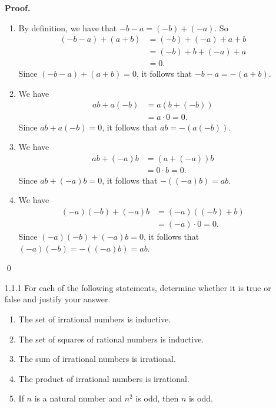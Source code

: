 \begin{enumerate}
      \textbf{Proof.} 
      \begin{enumerate}
         \item By definition, we have that $-b - a = (-b) + (-a)$. So
               \begin{align*}
                  (-b - a) + (a + b) &= (-b) + (-a) + a + b \\
                                 &= (-b) + b + (-a) + a \\
                                 &= 0.
               \end{align*}
               Since $(-b - a) + (a + b) = 0$, it follows that
               $-b - a = -(a + b)$.
         \item We have
               \begin{align*}
                  ab + a(-b) &= a(b + (-b)) \\
                             &= a \cdot 0 = 0.
               \end{align*}
               Since $ab + a(-b) = 0$, it follows that $ab = -(a(-b))$.
         \item We have
               \begin{align*}
                  ab + (-a)b &= (a + (-a))b \\
                             &= 0 \cdot b = 0.
               \end{align*}
               Since $ab + (-a)b = 0$, it follows that $-((-a)b) = ab$.
         \item We have
               \begin{align*}
                  (-a)(-b) + (-a)b &= (-a)((-b) + b) \\
                                   &= (-a) \cdot 0 = 0.
               \end{align*}
               Since $(-a)(-b) + (-a)b = 0$, it follows that
               $(-a)(-b) = -((-a)b) = ab$.
      \end{enumerate} \qed
   \item[1.1.1]   For each of the following statements, determine whether it is 
                  true or false and justify your answer.
                  \begin{enumerate}
                     \item The set of irrational numbers is inductive.
                     \item The set of squares of rational numbers is inductive.
                     \item The sum of irrational numbers is irrational.
                     \item The product of irrational numbers is irrational.
                     \item If $n$ is a natural number and $n^2$ is odd, then $n$
                           is odd.
                  \end{enumerate}


\end{enumerate}
